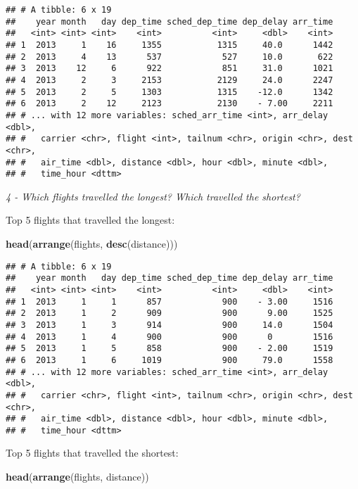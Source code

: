 \documentclass[]{article}
\newenvironment{Shaded}{\begin{snugshade}}{\end{snugshade}}
\newcommand{\KeywordTok}[1]{\textcolor[rgb]{0.13,0.29,0.53}{\textbf{#1}}}
\newcommand{\NormalTok}[1]{#1}
\theoremstyle{definition}
\theoremstyle{definition}
\theoremstyle{definition}
\theoremstyle{remark}
\begin{document}
\begin{verbatim}
## # A tibble: 6 x 19
##    year month   day dep_time sched_dep_time dep_delay arr_time
##   <int> <int> <int>    <int>          <int>     <dbl>    <int>
## 1  2013     1    16     1355           1315     40.0      1442
## 2  2013     4    13      537            527     10.0       622
## 3  2013    12     6      922            851     31.0      1021
## 4  2013     2     3     2153           2129     24.0      2247
## 5  2013     2     5     1303           1315    -12.0      1342
## 6  2013     2    12     2123           2130    - 7.00     2211
## # ... with 12 more variables: sched_arr_time <int>, arr_delay <dbl>,
## #   carrier <chr>, flight <int>, tailnum <chr>, origin <chr>, dest <chr>,
## #   air_time <dbl>, distance <dbl>, hour <dbl>, minute <dbl>,
## #   time_hour <dttm>
\end{verbatim}

\emph{4 - Which flights travelled the longest? Which travelled the
shortest?}

Top 5 flights that travelled the longest:

\begin{Shaded}
\begin{Highlighting}[]
\KeywordTok{head}\NormalTok{(}\KeywordTok{arrange}\NormalTok{(flights, }\KeywordTok{desc}\NormalTok{(distance)))}
\end{Highlighting}
\end{Shaded}

\begin{verbatim}
## # A tibble: 6 x 19
##    year month   day dep_time sched_dep_time dep_delay arr_time
##   <int> <int> <int>    <int>          <int>     <dbl>    <int>
## 1  2013     1     1      857            900    - 3.00     1516
## 2  2013     1     2      909            900      9.00     1525
## 3  2013     1     3      914            900     14.0      1504
## 4  2013     1     4      900            900      0        1516
## 5  2013     1     5      858            900    - 2.00     1519
## 6  2013     1     6     1019            900     79.0      1558
## # ... with 12 more variables: sched_arr_time <int>, arr_delay <dbl>,
## #   carrier <chr>, flight <int>, tailnum <chr>, origin <chr>, dest <chr>,
## #   air_time <dbl>, distance <dbl>, hour <dbl>, minute <dbl>,
## #   time_hour <dttm>
\end{verbatim}

Top 5 flights that travelled the shortest:

\begin{Shaded}
\begin{Highlighting}[]
\KeywordTok{head}\NormalTok{(}\KeywordTok{arrange}\NormalTok{(flights, distance))}
\end{Highlighting}
\end{Shaded}
\end{document}
